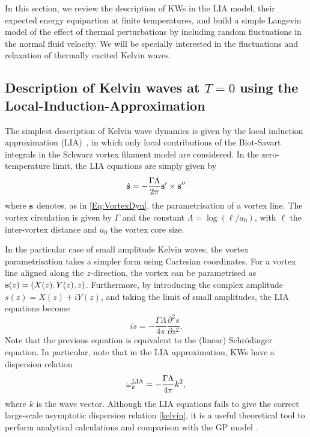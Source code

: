 \documentclass[sn-mathphys]{sn-jnl}%
\begin{document}
In this section, we review the description of KWs in the LIA model, their expected energy equipartion at finite temperatures, and build a simple Langevin model of the effect of thermal perturbations by including random fluctuations in the normal fluid velocity.
We will be specially interested in the fluctuations and relaxation of thermally excited Kelvin waves. 
 
\subsection{Description of Kelvin waves at $T=0$ using the Local-Induction-Approximation} \label{sec:newKVLIA}

The simplest description of Kelvin wave dynamics is given by the local induction approximation (LIA)~\cite{DaRios_SulMotoLiquido_1906}, in which only local contributions of the Biot-Savart integrals in the Schwarz vortex filament model \cite{Schwarz_85,Schwarz_88} are considered. In the zero-temperature limit, the LIA equations are simply given by
\begin{equation}
    \dot{{\bf s}}=-\frac{\Gamma \Lambda}{2\pi}{\bf s}'\times {\bf s}''
\end{equation}
where ${\bf s}$ denotes, as in \eqref{Eq:VortexDyn}, the parametrisation of a vortex line. The vortex circulation is given by $\Gamma$ and the constant $\Lambda=\log{(\ell/a_0)}$, with $\ell$ the inter-vortex distance and $a_0$ the vortex core size.

In the particular case of small amplitude Kelvin waves, the vortex parametrisation takes a simpler form using Cartesian coordinates. For a vortex line aligned along the $z$-direction, the vortex can be parametrised as ${\bf s}(z)=(X(z),Y(z),z)$. Furthermore, by introducing the complex amplitude $s(z)=X(z)+iY(z)$, and taking the limit of small amplitudes, the LIA equations become 
\begin{equation}
    i\dot{s}=-\frac{\Gamma \Lambda}{4\pi}\frac{\partial^2s}{\partial z^2}.
\end{equation}
Note that the previous equation is equivalent to the (linear) Schrödinger equation. In particular, note that in the LIA approximation, KWs have a dispersion relation 
\begin{equation}
    \omega_k^{\rm LIA}=-\frac{\Gamma \Lambda}{4\pi}k^2,
\end{equation}
where $k$ is the wave vector. Although the LIA equations fails to give the correct large-scale asymptotic dispersion relation \eqref{kelvin}, it is a useful theoretical tool to perform analytical calculations and comparison with the GP model \cite{Giuriato_InteractionActiveParticles_2019,Giuriato2020How}.
\end{document}
